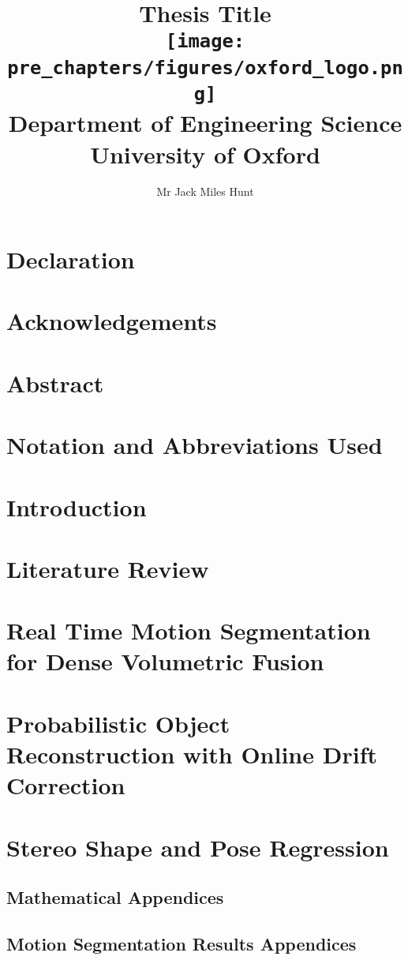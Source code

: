\documentclass
[
  12pt, 
  twoside
]{report}
\title{
    {Thesis Title}\\
    \vspace{10 mm}
    {\texttt{[image: pre\_chapters/figures/oxford\_logo.png]}\\
    {\large Department of Engineering Science\\ University of Oxford}\\}
}
\author{Mr Jack Miles Hunt}
\date{}
\begin{document}
\maketitle
\chapter*{Declaration}


\chapter*{Acknowledgements}


\chapter*{Abstract}


\chapter*{Notation and Abbreviations Used}


\tableofcontents
\listoffigures
\listoftables

\chapter{Introduction}


\chapter{Literature Review}


\chapter{Real Time Motion Segmentation for Dense Volumetric Fusion}


\chapter{Probabilistic Object Reconstruction with Online Drift Correction}


\chapter{Stereo Shape and Pose Regression}


\begin{appendices}
  \section{Mathematical Appendices}
  

  \section{Motion Segmentation Results Appendices}
  
\end{appendices}


\end{document}
